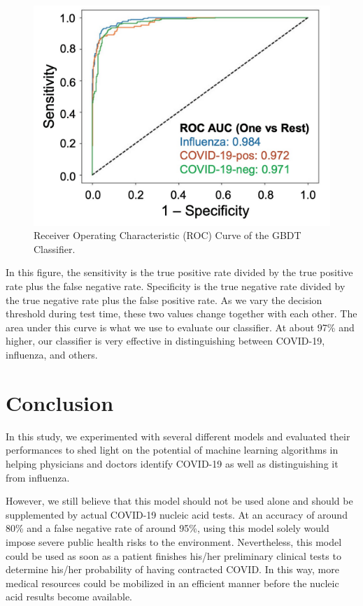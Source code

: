 \documentclass[a4paper, 11pt]{article}
\begin{document}
\begin{figure}[H]
\centering
\includegraphics[scale=0.25]{roc.png}
\caption{Receiver Operating Characteristic (ROC) Curve of the GBDT Classifier.}
\label{Confirmed Cases}
\end{figure}

In this figure, the sensitivity is the true positive rate divided by the true positive rate plus the false negative rate. Specificity is the true negative rate divided by the true negative rate plus the false positive rate. As we vary the decision threshold during test time, these two values change together with each other. The area under this curve is what we use to evaluate our classifier. At about 97\% and higher, our classifier is very effective in distinguishing between COVID-19, influenza, and others.

\section*{Conclusion}
In this study, we experimented with several different models and evaluated their performances to shed light on the potential of machine learning algorithms in helping physicians and doctors identify COVID-19 as well as distinguishing it from influenza. \par
However, we still believe that this model should not be used alone and should be supplemented by actual COVID-19 nucleic acid tests. At an accuracy of around 80\% and a false negative rate of around 95\%, using this model solely would impose severe public health risks to the environment. Nevertheless, this model could be used as soon as a patient finishes his/her preliminary clinical tests to determine his/her probability of having contracted COVID. In this way, more medical resources could be mobilized in an efficient manner before the nucleic acid results become available.
\end{document}
